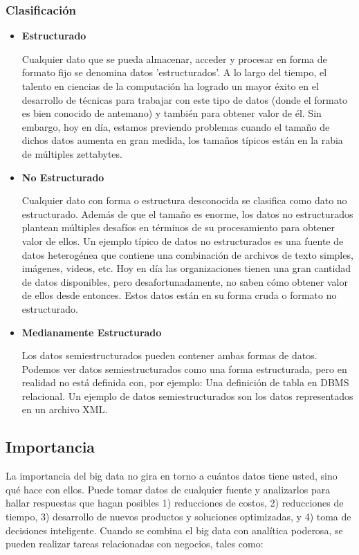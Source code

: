 \subsubsection{Clasificación}
\begin{itemize}
\item \textbf{Estructurado} 

Cualquier dato que se pueda almacenar, acceder y procesar en forma de formato fijo se denomina datos 'estructurados'. A lo largo del tiempo, el talento en ciencias de la computación ha logrado un mayor éxito en el desarrollo de técnicas para trabajar con este tipo de datos (donde el formato es bien conocido de antemano) y también para obtener valor de él. Sin embargo, hoy en día, estamos previendo problemas cuando el tamaño de dichos datos aumenta en gran medida, los tamaños típicos están en la rabia de múltiples zettabytes.

\item \textbf{No Estructurado}

Cualquier dato con forma o estructura desconocida se clasifica como dato no estructurado. Además de que el tamaño es enorme, los datos no estructurados plantean múltiples desafíos en términos de su procesamiento para obtener valor de ellos. Un ejemplo típico de datos no estructurados es una fuente de datos heterogénea que contiene una combinación de archivos de texto simples, imágenes, videos, etc. Hoy en día las organizaciones tienen una gran cantidad de datos disponibles, pero desafortunadamente, no saben cómo obtener valor de ellos desde entonces. Estos datos están en su forma cruda o formato no estructurado.

\item \textbf{Medianamente Estructurado}

Los datos semiestructurados pueden contener ambas formas de datos. Podemos ver datos semiestructurados como una forma estructurada, pero en realidad no está definida con, por ejemplo: Una definición de tabla en DBMS relacional. Un ejemplo de datos semiestructurados son los datos representados en un archivo XML.

\end{itemize}

\subsection{Importancia}
La importancia del big data no gira en torno a cuántos datos tiene usted, sino qué hace con ellos. Puede tomar datos de cualquier fuente y analizarlos para hallar respuestas que hagan posibles 1) reducciones de costos, 2) reducciones de tiempo, 3) desarrollo de nuevos productos y soluciones optimizadas, y 4) toma de decisiones inteligente. Cuando se combina el big data con analítica poderosa, se pueden realizar tareas relacionadas con negocios, tales como:

